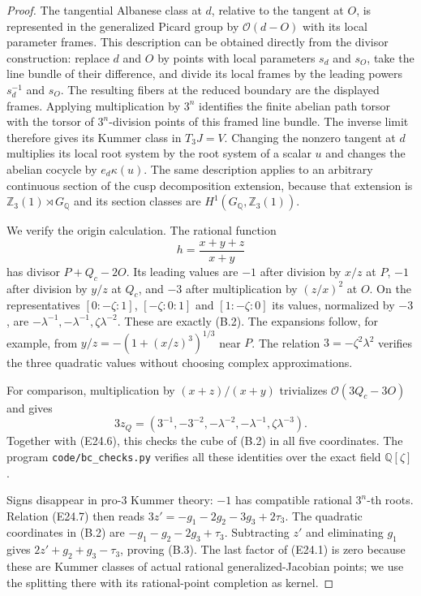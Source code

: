 \begin{proof}
The tangential Albanese class at $d$, relative to the tangent at $O$,
is represented in the generalized Picard group by
$\mathcal O(d-O)$ with its local parameter frames.  This description
can be obtained directly from the divisor construction: replace $d$
and $O$ by points with local parameters $s_d$ and $s_O$, take the
line bundle of their difference, and divide its local frames by the
leading powers $s_d^{-1}$ and $s_O$.  The resulting fibers at the
reduced boundary are the displayed frames.  Applying multiplication
by $3^n$ identifies the finite abelian path torsor with the torsor of
$3^n$-division points of this framed line bundle.  The inverse limit
therefore gives its Kummer class in $T_3J=V$.
Changing the nonzero tangent at $d$ multiplies its local root system
by the root system of a scalar $u$ and changes the abelian cocycle by
$e_d\kappa(u)$.  The same description applies to an arbitrary
continuous section of the cusp decomposition extension, because that
extension is $\mathbb Z_3(1)\rtimes G_{\mathbb Q}$ and its section
classes are $H^1(G_{\mathbb Q},\mathbb Z_3(1))$.

We verify the origin calculation.  The rational function
\[
 h=\frac{x+y+z}{x+y}
\]
has divisor $P+Q_c-2O$.  Its leading values are $-1$ after division
by $x/z$ at $P$, $-1$ after division by $y/z$ at $Q_c$, and $-3$
after multiplication by $(z/x)^2$ at $O$.  On the representatives
$[0:-\zeta:1]$, $[-\zeta:0:1]$ and $[1:-\zeta:0]$ its values,
normalized by $-3$, are
$-\lambda^{-1},-\lambda^{-1},\zeta\lambda^{-2}$.
These are exactly (B.2).  The expansions follow, for example, from
$y/z=-(1+(x/z)^3)^{1/3}$ near $P$.  The relation
$3=-\zeta^2\lambda^2$ verifies the three quadratic values without
choosing complex approximations.

For comparison, multiplication by
$(x+z)/(x+y)$ trivializes $\mathcal O(3Q_c-3O)$ and gives
\[
 3z_Q=(3^{-1},-3^{-2},-\lambda^{-2},-\lambda^{-1},
                                  \zeta\lambda^{-3}).       \tag{B.5}
\]
Together with (E24.6), this checks the cube of (B.2) in all five
coordinates.  The program \texttt{code/bc\_checks.py} verifies all
these identities over the exact field $\mathbb Q[\zeta]$.

Signs disappear in pro-$3$ Kummer theory: $-1$ has compatible
rational $3^n$-th roots.  Relation (E24.7) then reads
$3z'=-g_1-2g_2-3g_3+2\tau_3$.  The quadratic coordinates in (B.2)
are $-g_1-g_2-2g_3+\tau_3$.  Subtracting $z'$ and eliminating $g_1$
gives $2z'+g_2+g_3-\tau_3$, proving (B.3).
The last factor of (E24.1) is zero because these are Kummer classes
of actual rational generalized-Jacobian points; we use the splitting
there with its rational-point completion as kernel.


\end{proof}

